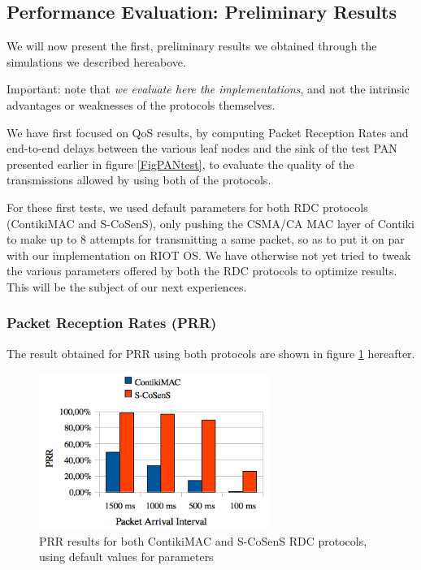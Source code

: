 \documentclass[a4paper,twoside]{article}
\begin{document}
\subsection{Performance Evaluation: Preliminary Results}

We will now present the first, preliminary results we obtained through the
simulations we described hereabove.

Important: note that \emph{we evaluate here the implementations}, and not the
intrinsic advantages or weaknesses of the protocols themselves.

We have first focused on QoS results, by computing Packet Reception Rates
and end-to-end delays between the various leaf nodes and the sink of the test
PAN presented earlier in figure \ref{FigPANtest}, to evaluate the quality
of the transmissions allowed by using both of the protocols.

For these first tests, we used default parameters for both RDC protocols
(ContikiMAC and S-CoSenS), only pushing the CSMA/CA MAC layer of Contiki
to make up to 8 attempts for transmitting a same packet, so as to put it
on par with our implementation on RIOT OS. We have otherwise not yet
tried to tweak the various parameters offered by both the RDC protocols
to optimize results. This will be the subject of our next experiences.

\subsubsection{Packet Reception Rates (PRR)}

The result obtained for PRR using both protocols are shown in figure
\ref{FigPRRresults} hereafter.

\begin{figure}
  \centering
  \includegraphics[width=7.5cm]{PRRgraph.png}
  \caption{PRR results for both ContikiMAC and S-CoSenS RDC protocols,
           using default values for parameters}
  \label{FigPRRresults}
\end{figure}
\end{document}
